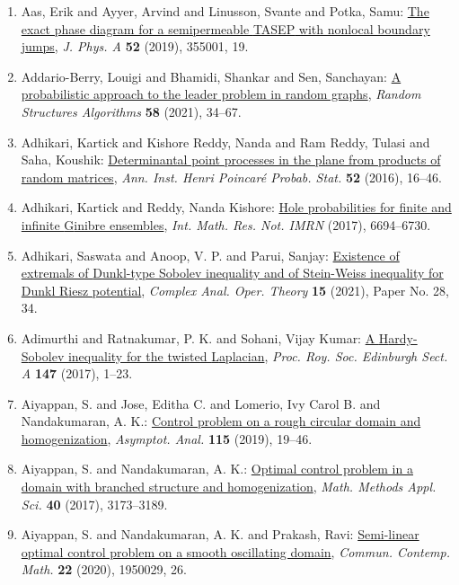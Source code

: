 \begin{enumerate}
\item Aas, Erik and Ayyer, Arvind and Linusson, Svante and Potka,
Samu: \href{https://doi.org/10.1088/1751-8121/ab2e96}{The exact phase diagram for a semipermeable {TASEP} with
nonlocal boundary jumps}, \emph{J. Phys. A} {\bf 52} (2019), 355001, 19.
\item Addario-Berry, Louigi and Bhamidi, Shankar and Sen, Sanchayan: \href{https://doi.org/10.1002/rsa.20966}{A probabilistic approach to the leader problem in random
graphs}, \emph{Random Structures Algorithms} {\bf 58} (2021), 34--67.
\item Adhikari, Kartick and Kishore Reddy, Nanda and Ram Reddy,
Tulasi and Saha, Koushik: \href{https://doi.org/10.1214/14-AIHP632}{Determinantal point processes in the plane from products of
random matrices}, \emph{Ann. Inst. Henri Poincar\'{e} Probab. Stat.} {\bf 52} (2016), 16--46.
\item Adhikari, Kartick and Reddy, Nanda Kishore: \href{https://doi.org/10.1093/imrn/rnw207}{Hole probabilities for finite and infinite {G}inibre
ensembles}, \emph{Int. Math. Res. Not. IMRN} {\bf } (2017), 6694--6730.
\item Adhikari, Saswata and Anoop, V. P. and Parui, Sanjay: \href{https://doi.org/10.1007/s11785-020-01068-1}{Existence of extremals of {D}unkl-type {S}obolev inequality
and of {S}tein-{W}eiss inequality for {D}unkl {R}iesz
potential}, \emph{Complex Anal. Oper. Theory} {\bf 15} (2021), Paper No. 28, 34.
\item Adimurthi and Ratnakumar, P. K. and Sohani, Vijay Kumar: \href{https://doi.org/10.1017/S0308210516000081}{A {H}ardy-{S}obolev inequality for the twisted {L}aplacian}, \emph{Proc. Roy. Soc. Edinburgh Sect. A} {\bf 147} (2017), 1--23.
\item Aiyappan, S. and Jose, Editha C. and Lomerio, Ivy Carol B. and
Nandakumaran, A. K.: \href{https://doi.org/10.3233/asy-191526}{Control problem on a rough circular domain and homogenization}, \emph{Asymptot. Anal.} {\bf 115} (2019), 19--46.
\item Aiyappan, S. and Nandakumaran, A. K.: \href{https://doi.org/10.1002/mma.4231}{Optimal control problem in a domain with branched structure
and homogenization}, \emph{Math. Methods Appl. Sci.} {\bf 40} (2017), 3173--3189.
\item Aiyappan, S. and Nandakumaran, A. K. and Prakash, Ravi: \href{https://doi.org/10.1142/S0219199719500299}{Semi-linear optimal control problem on a smooth oscillating
domain}, \emph{Commun. Contemp. Math.} {\bf 22} (2020), 1950029, 26.

\end{enumerate}
